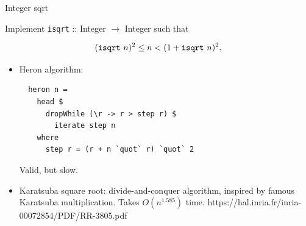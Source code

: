 \documentclass[handout]{beamer}
\def\isqrt#1{{\tt isqrt}~#1}
\begin{document}
\begin{frame}[fragile]{Integer sqrt}

Implement {\tt isqrt} :: Integer $\to$ Integer such that

$$(\isqrt n)^2 \le n < (1 + \isqrt n)^2.$$

\begin{itemize}

\item Heron algorithm:

  \begin{lstlisting}
  heron n =
    head $
      dropWhile (\r -> r > step r) $
        iterate step n
    where
      step r = (r + n `quot` r) `quot` 2
  \end{lstlisting}

  Valid, but slow.

\item Karatsuba square root: divide-and-conquer algorithm,
inspired by famous Karatsuba multiplication.
Takes $O(n^{1.585})$ time.
https://hal.inria.fr/inria-00072854/PDF/RR-3805.pdf

\end{itemize}

\end{frame}
\end{document}
